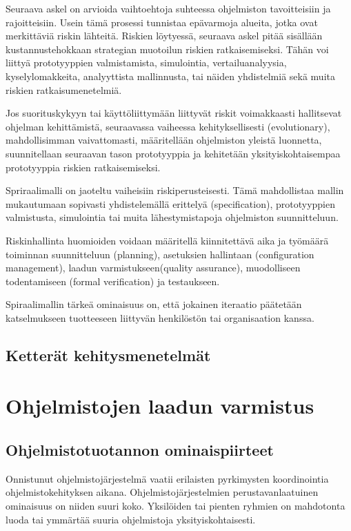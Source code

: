 \documentclass[finnish]{tktltiki2}
\theoremstyle{definition}
\theoremstyle{remark}
\begin{document}
Seuraava askel on arvioida vaihtoehtoja suhteessa ohjelmiston tavoitteisiin ja rajoitteisiin. Usein tämä prosessi tunnistaa epävarmoja alueita, jotka ovat merkittäviä riskin lähteitä. Riskien löytyessä, seuraava askel pitää sisällään kustannustehokkaan strategian muotoilun riskien ratkaisemiseksi. Tähän voi liittyä prototyyppien valmistamista, simulointia, vertailuanalyysia, kyselylomakkeita, analyyttista mallinnusta, tai näiden yhdistelmiä sekä muita riskien ratkaisumenetelmiä.\cite{BOE88}


Jos suorituskykyyn tai käyttöliittymään liittyvät riskit voimakkaasti hallitsevat ohjelman kehittämistä, seuraavassa vaiheessa kehityksellisesti (evolutionary), mahdollisimman vaivattomasti, määritellään ohjelmiston yleistä luonnetta, suunnitellaan seuraavan tason prototyyppia ja kehitetään yksityiskohtaisempaa prototyyppia riskien ratkaisemiseksi.\cite{BOE88}

Spriraalimalli on jaoteltu vaiheisiin riskiperusteisesti. Tämä mahdollistaa mallin mukautumaan sopivasti yhdistelemällä erittelyä (specification), prototyyppien valmistusta, simulointia tai muita lähestymistapoja ohjelmiston suunnitteluun.\cite{BOE88}

Riskinhallinta huomioiden voidaan määritellä kiinnitettävä aika ja työmäärä toiminnan suunnitteluun (planning), asetuksien hallintaan (configuration management), laadun varmistukseen(quality assurance), muodolliseen todentamiseen (formal verification) ja testaukseen.\cite{BOE88}

Spiraalimallin tärkeä ominaisuus on, että jokainen iteraatio päätetään katselmukseen tuotteeseen liittyvän henkilöstön tai organisaation kanssa.\cite{BOE88}

\subsection{Ketterät kehitysmenetelmät}

\section{Ohjelmistojen laadun varmistus}

\subsection{Ohjelmistotuotannon ominaispiirteet}

Onnistunut ohjelmistojärjestelmä vaatii erilaisten pyrkimysten koordinointia ohjelmistokehityksen aikana. Ohjelmistojärjestelmien perustavanlaatuinen ominaisuus on niiden suuri koko. Yksilöiden tai pienten ryhmien on mahdotonta luoda tai ymmärtää suuria ohjelmistoja yksityiskohtaisesti.\cite{KES95}
\end{document}
